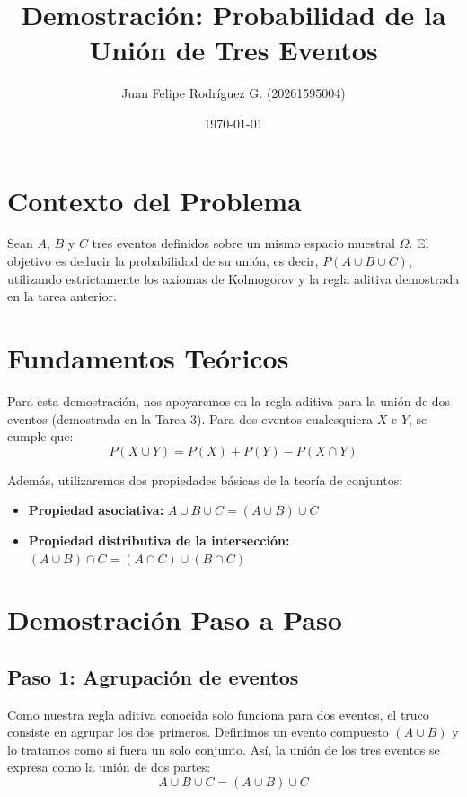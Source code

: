 \documentclass{article}
\title{Demostración: Probabilidad de la Unión de Tres Eventos}
\author{Juan Felipe Rodríguez G. (20261595004)}
\date{\today}
\begin{document}
    \maketitle
    
    \section*{Contexto del Problema}
    
    Sean $A$, $B$ y $C$ tres eventos definidos sobre un mismo espacio muestral $\Omega$. El objetivo es deducir la probabilidad de su unión, es decir, $P(A \cup B \cup C)$, utilizando estrictamente los axiomas de Kolmogorov y la regla aditiva demostrada en la tarea anterior.
    
    \section*{Fundamentos Teóricos}
    
    Para esta demostración, nos apoyaremos en la regla aditiva para la unión de dos eventos (demostrada en la Tarea 3). Para dos eventos cualesquiera $X$ e $Y$, se cumple que:
    $$P(X \cup Y) = P(X) + P(Y) - P(X \cap Y)$$
    
    Además, utilizaremos dos propiedades básicas de la teoría de conjuntos:
    \begin{itemize}
        \item \textbf{Propiedad asociativa:} $A \cup B \cup C = (A \cup B) \cup C$
        \item \textbf{Propiedad distributiva de la intersección:} $(A \cup B) \cap C = (A \cap C) \cup (B \cap C)$
    \end{itemize}
    
    \section*{Demostración Paso a Paso}
    
    \subsection*{Paso 1: Agrupación de eventos}
    Como nuestra regla aditiva conocida solo funciona para dos eventos, el truco consiste en agrupar los dos primeros. Definimos un evento compuesto $(A \cup B)$ y lo tratamos como si fuera un solo conjunto. Así, la unión de los tres eventos se expresa como la unión de dos partes:
    $$A \cup B \cup C = (A \cup B) \cup C$$
    
\end{document}
